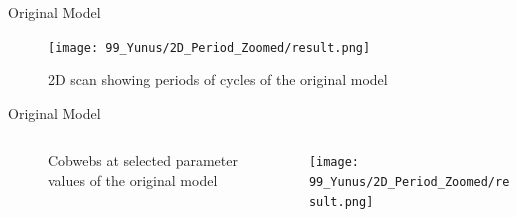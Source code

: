 \begin{frame}{Original Model}
    \begin{figure}
        \centering
        \texttt{[image: 99\_Yunus/2D\_Period\_Zoomed/result.png]}
        \caption{2D scan showing periods of cycles of the original model}
    \end{figure}
\end{frame}

\begin{frame}{Original Model}
    \begin{columns}[t]
        \begin{column}{.9 \textwidth}
            \vspace{-2em}
            \begin{center}
                \begin{figure}
                    \centering
                    \caption{Cobwebs at selected parameter values of the original model}
                \end{figure}
            \end{center}
        \end{column}
        \begin{column}{.2 \textwidth}
            \vspace{-4em}
            \begin{center}
                \hspace{-2em}
                \texttt{[image: 99\_Yunus/2D\_Period\_Zoomed/result.png]}
            \end{center}
        \end{column}
    \end{columns}
\end{frame}

